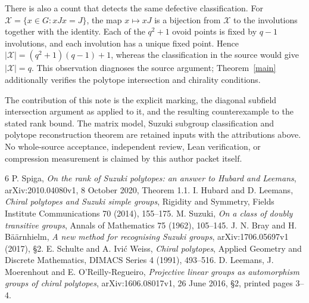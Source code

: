 \documentclass[11pt,a4paper]{article}
\begin{document}
There is also a count that detects the same defective classification.
For $\mathcal X=\{x\in G:xJx=J\}$, the map $x\mapsto xJ$ is a
bijection from $\mathcal X$ to the involutions together with the
identity. Each of the $q^2+1$ ovoid points is fixed by $q-1$
involutions, and each involution has a unique fixed point. Hence
$|\mathcal X|=(q^2+1)(q-1)+1$, whereas the classification in the source
would give $|\mathcal X|=q$. This observation diagnoses the source
argument; Theorem~\ref{main} additionally verifies the polytope
intersection and chirality conditions.

The contribution of this note is the explicit marking, the diagonal
subfield intersection argument as applied to it, and the resulting
counterexample to the stated rank bound. The matrix model, Suzuki
subgroup classification and polytope reconstruction theorem are
retained inputs with the attributions above. No whole-source
acceptance, independent review, Lean verification, or compression
measurement is claimed by this author packet itself.

\begin{thebibliography}{6}
 P. Spiga, \emph{On the rank of Suzuki polytopes:
an answer to Hubard and Leemans}, arXiv:2010.04080v1,
8 October 2020, Theorem 1.1.
 I. Hubard and D. Leemans, \emph{Chiral polytopes and
Suzuki simple groups}, Rigidity and Symmetry, Fields Institute
Communications 70 (2014), 155--175.
 M. Suzuki, \emph{On a class of doubly transitive
groups}, Annals of Mathematics 75 (1962), 105--145.
 J. N. Bray and H. B\"a\"arnhielm,
\emph{A new method for recognising Suzuki groups},
arXiv:1706.05697v1 (2017), \S2.
 E. Schulte and A. Ivi\'c Weiss, \emph{Chiral polytopes},
Applied Geometry and Discrete Mathematics, DIMACS Series 4 (1991),
493--516.
 D. Leemans, J. Moerenhout and E. O'Reilly-Regueiro,
\emph{Projective linear groups as automorphism groups of chiral
polytopes}, arXiv:1606.08017v1, 26 June 2016, \S2, printed pages 3--4.
\end{thebibliography}
\end{document}
